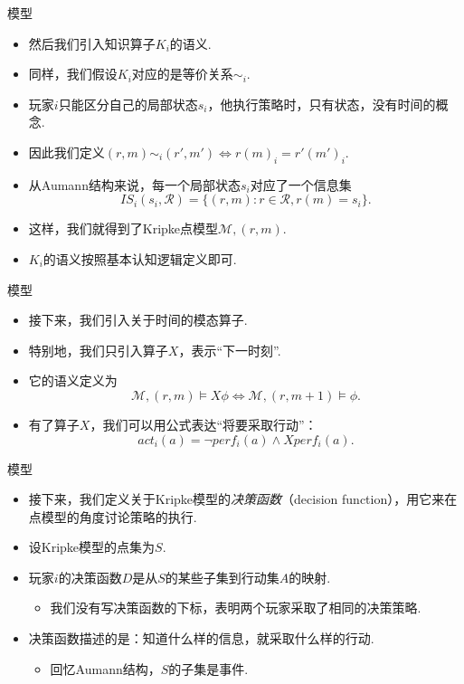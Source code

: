 \begin{frame}{模型}
\begin{itemize}
    \item 然后我们引入知识算子$K_i$的语义.
    \item 同样，我们假设$K_i$对应的是等价关系$\sim_i$.
    \item 玩家$i$只能区分自己的局部状态$s_i$，他执行策略时，只有状态，没有时间的概念.
    \item 因此我们定义$(r,m)\sim_i (r',m')\iff r(m)_i=r'(m')_i$.
    \item 从Aumann结构来说，每一个局部状态$s_i$对应了一个信息集
    \[IS_i(s_i,\mathcal R)=\{(r,m):r\in\mathcal R,r(m)=s_i\}.\]
    \item 这样，我们就得到了Kripke点模型$\mathcal M,(r,m)$.
    \item $K_i$的语义按照基本认知逻辑定义即可.
\end{itemize}
\end{frame}

\begin{frame}{模型}
\begin{itemize}
    \item 接下来，我们引入关于时间的模态算子.
    \item 特别地，我们只引入算子$X$，表示“下一时刻”.
    \item 它的语义定义为
    \[\mathcal M,(r,m)\vDash X\phi\iff\mathcal M,(r,m+1)\vDash\phi.\]
    \item 有了算子$X$，我们可以用公式表达“将要采取行动”：
    \[act_i(a)=\neg perf_i(a)\wedge X perf_i(a).\]
\end{itemize}
\end{frame}


\begin{frame}{模型}
\begin{itemize}
    \item 接下来，我们定义关于Kripke模型的\emph{决策函数}（decision function），用它来在点模型的角度讨论策略的执行.
    \item 设Kripke模型的点集为$S$.
    \item 玩家$i$的决策函数$D$是从$S$的某些子集到行动集$A$的映射.
    \begin{itemize}
        \item 我们没有写决策函数的下标，表明两个玩家采取了相同的决策策略.
    \end{itemize}
    \item 决策函数描述的是：知道什么样的信息，就采取什么样的行动.
    \begin{itemize}
        \item 回忆Aumann结构，$S$的子集是事件.
    \end{itemize}
\end{itemize}
\end{frame}

